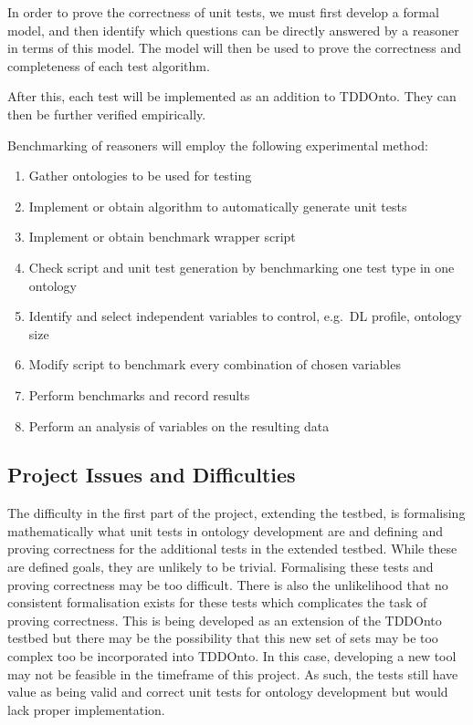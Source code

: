 \documentclass[draft]{sig-alternate}
\begin{document}
In order to prove the correctness of unit tests, we must first develop a formal model, and then identify which questions can be directly answered by a reasoner in terms of this model.  The model will then be used to prove the correctness and completeness of each test algorithm.

After this, each test will be implemented as an addition to TDDOnto.  They can then be further verified empirically.

Benchmarking of reasoners will employ the following experimental method:
\begin{enumerate}[noitemsep]
  \item Gather ontologies to be used for testing
  \item Implement or obtain algorithm to automatically generate unit tests
  \item Implement or obtain benchmark wrapper script
  \item Check script and unit test generation by benchmarking one test type in one ontology
  \item Identify and select independent variables to control, e.g.\ DL profile, ontology size
  \item Modify script to benchmark every combination of chosen variables
  \item Perform benchmarks and record results
  \item Perform an analysis of variables on the resulting data
\end{enumerate}

\subsection{Project Issues and Difficulties}

The difficulty in the first part of the project, extending the testbed, is formalising mathematically what unit tests in ontology development are and defining and proving correctness for the additional tests in the extended testbed. While these are defined goals, they are unlikely to be trivial. Formalising these tests and proving correctness may be too difficult. There is also the unlikelihood that no consistent formalisation exists for these tests which complicates the task of proving correctness. This is being developed as an extension of the TDDOnto testbed but there may be the possibility that this new set of sets may be too complex too be incorporated into TDDOnto. In this case, developing a new tool may not be feasible in the timeframe of this project. As such, the tests still have value as being valid and correct unit tests for ontology development but would lack proper implementation.
\end{document}

